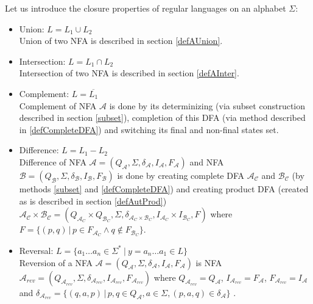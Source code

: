 		Let us introduce the closure properties of regular languages on an alphabet $\Sigma$:
		\begin{itemize}
			\item Union:  $L=L_1 \cup L_2$\\%
      Union of two NFA is described in section \ref{defAUnion}.
			\item Intersection:  $L=L_1 \cap L_2$\\%
      Intersection of two NFA is described in section \ref{defAInter}.
			\item Complement: $L=\overline{L_1}$\\%
      Complement of NFA $\mathcal{A}$ is done by its determinizing (via subset construction described in section \ref{subset}), completion of this DFA (via
      method described in \ref{defCompleteDFA}) and switching its final and non-final states set.

      \item Difference: $L=L_1-L_2$\\%
      Difference of NFA $\mathcal{A}=(Q_\mathcal{A},\Sigma,\delta_\mathcal{A},I_\mathcal{A},F_\mathcal{A})$ 
      and NFA $\mathcal{B}=(Q_\mathcal{B},\Sigma,\delta_\mathcal{B},I_\mathcal{B},F_\mathcal{B})$ is done by creating
      complete DFA $\mathcal{A_C}$ and $\mathcal{B_C}$ (by methods \ref{subset} and \ref{defCompleteDFA}) 
      and creating product DFA (created as is described in section 
      \ref{defAutProd})
      $\mathcal{A_C} \times \mathcal{B_C}=
          (Q_{\mathcal{A}_C}\times Q_{\mathcal{B}_C},\Sigma,\delta_{{\mathcal{A}_C}\times{\mathcal{B}_C}},I_{\mathcal{A}_C}\times I_{\mathcal{B}_C},F)$
      where $F=\{(p,q)\,|\, p\in F_{\mathcal{A}_C} \wedge q\not\in F_{\mathcal{B}_C}\}$.

			\item Reversal: $L=\{a_1\dots a_n \in \Sigma^{*} \ |\ y=a_n\dots a_1 \in L\}$\\
      Reversion of a NFA $\mathcal{A}=(Q_\mathcal{A},\Sigma,\delta_\mathcal{A},I_\mathcal{A},F_\mathcal{A})$ is
      NFA $\mathcal{A}_{rev}=(Q_{\mathcal{A}_{rev}},\Sigma,\delta_{\mathcal{A}_{rev}},I_{\mathcal{A}_{rev}},F_{\mathcal{A}_{rev}})$ 
      where $Q_{\mathcal{A}_{rev}} = Q_\mathcal{A}$, 
      $I_{\mathcal{A}_{rev}} = F_\mathcal{A}$, $F_{\mathcal{A}_{rev}} = I_\mathcal{A}$ and 
      $\delta_{\mathcal{A}_{rev}}=\{(q,a,p)\,|\,p,q \in Q_\mathcal{A}, a \in \Sigma,(p,a,q)\in\delta_{\mathcal{A}}\}$ .


\end{itemize}
